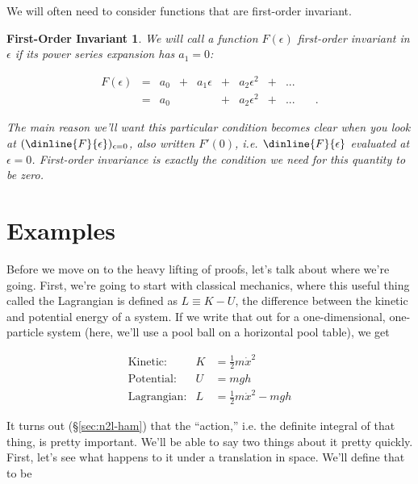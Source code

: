 \documentclass[12pt]{article}
\newtheorem{firstorderinvariant}{First-Order Invariant}
\newcommand{\coord}{x}
\newcommand{\xd}{\dot{\coord}}
\numberwithin{equation}{section}
\begin{document}
We will often need to consider functions that are first-order invariant.

\begin{firstorderinvariant}
We will call a function $F(\epsilon)$ first-order invariant in $\epsilon$ if its power series expansion has $a_1=0$:

\begin{equation}
  \label{eq:firstorderinvariant}
  \begin{matrix}
    F(\epsilon) &=& a_0 &+& a_1\epsilon &+& a_2\epsilon^2 &+&...& \\ 
                &=& a_0 & &             &+& a_2\epsilon^2 &+&...& \quad .
 \end{matrix}
\end{equation}

The main reason we'll want this particular condition becomes clear
when you look at  $(\dinline{F}{\epsilon})_{\epsilon=0}$, also written $F'(0)$, i.e. $\dinline{F}{\epsilon}$ evaluated at
$\epsilon=0$. First-order invariance is exactly the condition we need
for this quantity to be zero.

\end{firstorderinvariant}

\section{Examples}

Before we move on to the heavy lifting of proofs, let's talk about
where we're going. First, we're going to start with classical
mechanics, where this useful thing called the Lagrangian is defined as
$L\equiv K-U$, the difference between the kinetic and potential energy
of a system. If we write that out for a one-dimensional, one-particle
system (here, we'll use a pool ball on a horizontal pool table), we get

\begin{eqnarray}
  \textrm{Kinetic:} & K &= \frac{1}{2}m\xd^2 \\
  \textrm{Potential:} & U &= mgh\\
  \label{eq:poolL}
  \textrm{Lagrangian:} & L &= \frac{1}{2}m\xd^2 - mgh
\end{eqnarray}

It turns out (\S\ref{sec:n2l-ham}) that the ``action,'' i.e. the
definite integral of that thing, is pretty important. We'll be able to
say two things about it pretty quickly. First, let's see what happens
to it under a translation in space. We'll define that to be
\end{document}
